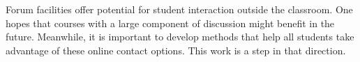 Forum facilities offer potential for student interaction outside the
classroom. One hopes that courses with a large component of discussion
might benefit in the future. Meanwhile, it is important to develop
methods that help all students take advantage of these online contact
options. This work is a step in that direction.





